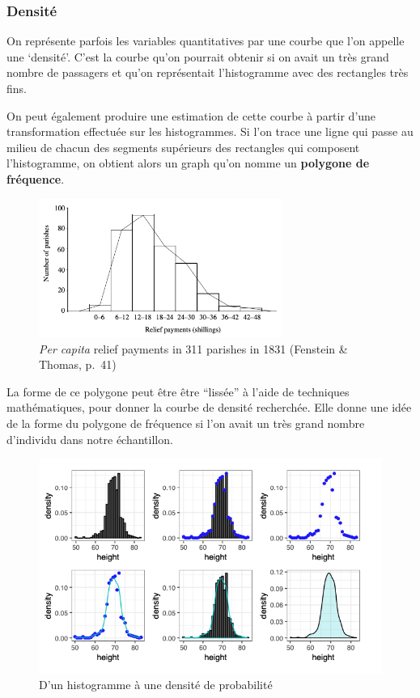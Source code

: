 \documentclass[
]{book}
\begin{document}
\hypertarget{densituxe9}{%
\subsubsection{Densité}\label{densituxe9}}

On représente parfois les variables quantitatives par une courbe que l'on appelle une `densité'. C'est la courbe qu'on pourrait obtenir si on avait un très grand nombre de passagers et qu'on représentait l'histogramme avec des rectangles très fins.

On peut également produire une estimation de cette courbe à partir d'une transformation effectuée sur les histogrammes. Si l'on trace une ligne qui passe au milieu de chacun des segments supérieurs des rectangles qui composent l'histogramme, on obtient alors un graph qu'on nomme un \textbf{polygone de fréquence}.

\begin{figure}
\centering
\includegraphics[width=3.125in,height=\textheight]{images/frequencypol.png}
\caption{\emph{Per capita} relief payments in 311 parishes in 1831 (Fenstein \& Thomas, p.~41)}
\end{figure}

La forme de ce polygone peut être être ``lissée'' à l'aide de techniques mathématiques, pour donner la courbe de densité recherchée. Elle donne une idée de la forme du polygone de fréquence si l'on avait un très grand nombre d'individu dans notre échantillon.

\begin{figure}
\centering
\includegraphics{images/density.png}
\caption{D'un histogramme à une densité de probabilité}
\end{figure}
\end{document}
